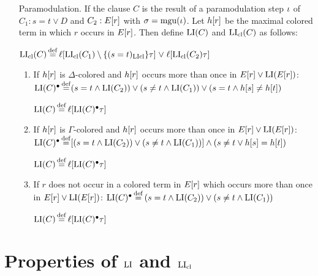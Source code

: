 \documentclass[,%
	draft=false,%
	numbers=noendperiod
	11pt,
	a4paper,
	oneside,%
	openany,
]{memoir}
\begin{document}
\begin{defi}
\begin{itemize}
		\item[Paramodulation.]
			If the clause $C$ is the result of a paramodulation step $\iota$ of $C_1 : s = t \lor D$ and $C_2: E[r]$ with $\sigma = \operatorname{mgu}(\iota)$.
			Let $h[r]$ be the maximal colored term in which $r$ occurs in $E[r]$.
			Then define $\operatorname{LI}(C)$ and $\operatorname{LI}_{\operatorname{cl}}(C)$ as follows:

			$\operatorname{LI}_{\operatorname{cl}}(C) \operatorname{\stackrel{\mathrm{def}}{=}} \ell[ \operatorname{LI}_{\operatorname{cl}}(C_1) \setminus\{(s=t)_{\operatorname{LIcl}}\} \tau] \;{\lor}\; \ell[\operatorname{LI}_{\operatorname{cl}}(C_2) \tau] $

			\begin{enumerate}

				\item If $h[r]$ is $\Delta$-colored and $h[r]$ occurs more than once in $E[r] \lor \operatorname{LI}(E[r])$:
					\newline
					$\operatorname{LI}(C)^\bullet \operatorname{\stackrel{\mathrm{def}}{=}}  ( s=t \land \operatorname{LI}(C_2) ) \lor (s\neq t \land \operatorname{LI}(C_1)) \lor (s=t \land h[s] \neq      h[t])$

				$\operatorname{LI}(C) \operatorname{\stackrel{\mathrm{def}}{=}} \ell[\operatorname{LI}(C)^\bullet \tau]$
				\item If $h[r]$ is $\Gamma$-colored and $h[r]$ occurs more than once in $E[r] \lor \operatorname{LI}(E[r])$:
					\newline
					$\operatorname{LI}(C)^\bullet \operatorname{\stackrel{\mathrm{def}}{=}}  [ ( s=t \land \operatorname{LI}(C_2) ) \lor (s\neq t \land \operatorname{LI}(C_1)) ] \land (s\neq t \lor h[s] = h[t])$

					$\operatorname{LI}(C) \operatorname{\stackrel{\mathrm{def}}{=}} \ell[\operatorname{LI}(C)^\bullet \tau]$
				\item If $r$ does not occur in a colored term in $E[r]$ which occurs more than once in $E[r] \lor \operatorname{LI}(E[r])$:
					\newline
					$\operatorname{LI}(C)^\bullet \operatorname{\stackrel{\mathrm{def}}{=}}{} ( s=t \land \operatorname{LI}(C_2) ) \lor (s\neq t \land \operatorname{LI}(C_1)) $ 

					$\operatorname{LI}(C) \operatorname{\stackrel{\mathrm{def}}{=}} \ell[\operatorname{LI}(C)^\bullet \tau]$
\qedhere

			\end{enumerate}

	\end{itemize}

\end{defi}

\section{Properties of $\operatorname{LI}$ and $\operatorname{LI}_{\operatorname{cl}}$}
\end{document}
